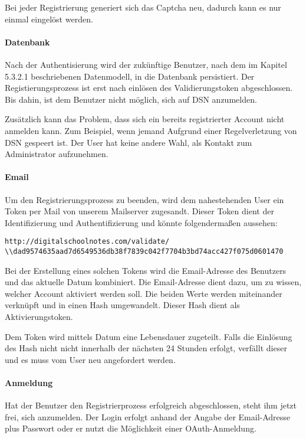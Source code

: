 Bei jeder Registrierung generiert sich das Captcha neu, dadurch kann es nur einmal eingelöst werden.


\newpage

\paragraph{Datenbank}
Nach der Authentisierung wird der zukünftige Benutzer, nach dem im Kapitel 5.3.2.1 beschriebenen Datenmodell, in die Datenbank persistiert. Der Registierungsprozess ist erst nach einlösen des Validierungstoken abgeschlossen. Bis dahin, ist dem Benutzer nicht möglich, sich auf DSN anzumelden.

Zusätzlich kann das Problem, dass sich ein bereits registrierter Account nicht anmelden kann. Zum Beispiel, wenn jemand Aufgrund einer Regelverletzung von DSN gespeert ist. Der User hat keine andere Wahl, als Kontakt zum Administrator aufzunehmen.

\paragraph{Email}
Um den Registrierungsprozess zu beenden, wird dem nahestehenden User ein Token per Mail von unserem Mailserver zugesandt. Dieser Token dient der Identifizierung und Authentifizierung und könnte folgendermaßen aussehen:
\begin{lstlisting}[caption={Validierungstoken für die Aktivierung des DSN-Accounts}]
http://digitalschoolnotes.com/validate/
\\dad9574635aad7d6549536db38f7839c042f7704b3bd74acc427f075d0601470
\end{lstlisting}

Bei der Erstellung eines solchen Tokens wird die Email-Adresse des Benutzers und das aktuelle Datum kombiniert. Die Email-Adresse dient dazu, um zu wissen, welcher Account aktiviert werden soll. Die beiden Werte werden miteinander verknüpft und in einen Hash umgewandelt. Dieser Hash dient als Aktivierungstoken.

Dem Token wird mittels Datum eine Lebensdauer zugeteilt. Falls die Einlösung des Hash nicht nicht innerhalb der nächsten 24 Stunden erfolgt, verfällt dieser und es muss vom User neu angefordert werden. 

\paragraph{Anmeldung}
Hat der Benutzer den Registrierprozess erfolgreich abgeschlossen, steht ihm jetzt frei, sich anzumelden. Der Login erfolgt anhand der Angabe der Email-Adresse plus Passwort oder er nutzt die Möglichkeit einer OAuth-Anmeldung.

